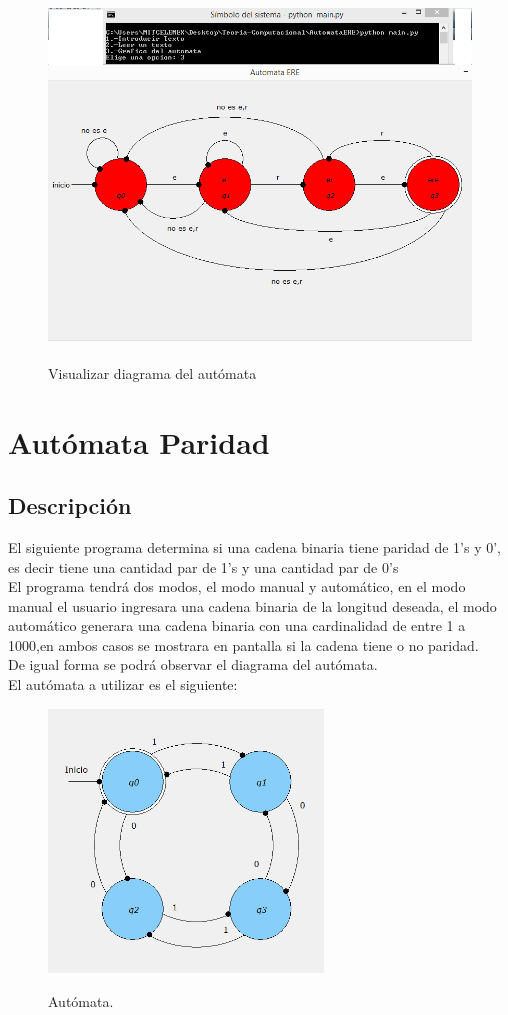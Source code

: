\documentclass[12pt,letterpaper]{article}
\begin{document}
\begin{figure}[H]
\includegraphics[width=\textwidth, height=9cm]{diagERE.png}
\label{fig:Diagautomataere}
\caption{Visualizar diagrama del aut\'omata}
\end{figure}


\newpage
\section{Aut\'omata Paridad}
\subsection{Descripci\'on}
\justify
El siguiente programa determina si una cadena binaria tiene paridad de 1's y 0', es decir tiene una cantidad par de 1's y una cantidad par de 0's\\
El programa tendr\'a dos modos, el modo manual y autom\'atico, en el modo manual el usuario ingresara una cadena binaria de la longitud deseada, el modo autom\'atico generara una cadena binaria con una cardinalidad de entre 1 a 1000,en ambos casos se mostrara en pantalla si la cadena tiene o no paridad.\\
De igual forma se podr\'a observar el diagrama del aut\'omata.\\
El aut\'omata a utilizar es el siguiente:\\

\begin{figure}[H]
\includegraphics[width=\textwidth, height=7cm]{diagramaautomataPar.png}
\label{fig:automataParidad}
\caption{Aut\'omata.}
\end{figure}
\end{document}
